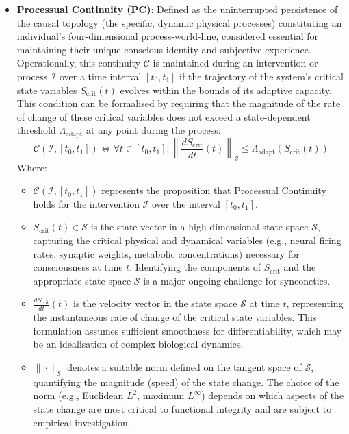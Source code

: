 \documentclass[10pt]{article}
\begin{document}
\begin{sloppypar}
\begin{itemize}
    \item \textbf{Processual Continuity (PC)}: Defined as the uninterrupted persistence of the causal topology (the specific, dynamic physical processes) constituting an individual’s four-dimensional process-world-line, considered essential for maintaining their unique conscious identity and subjective experience. Operationally, this continuity \( \mathcal{C} \) is maintained during an intervention or process \( \mathcal{I} \) over a time interval \( [t_0, t_1] \) if the trajectory of the system’s critical state variables \( S_{\text{crit}}(t) \) evolves within the bounds of its adaptive capacity. This condition can be formalised by requiring that the magnitude of the rate of change of these critical variables does not exceed a state-dependent threshold \( \Lambda_{\text{adapt}} \) at any point during the process:
          \begin{equation}
            \mathcal{C}(\mathcal{I}, [t_0, t_1]) \iff \forall t \in [t_0, t_1] : \left\| \frac{dS_{\text{crit}}}{dt}(t) \right\|_{\mathcal{S}} \le \Lambda_{\text{adapt}}(S_{\text{crit}}(t))
            \label{eq:continuity}
          \end{equation}
          Where:
          \begin{itemize}
            \item \( \mathcal{C}(\mathcal{I}, [t_0, t_1]) \) represents the proposition that Processual Continuity holds for the intervention \( \mathcal{I} \) over the interval \( [t_0, t_1] \).
            \item \( S_{\text{crit}}(t) \in \mathcal{S} \) is the state vector in a high-dimensional state space \( \mathcal{S} \), capturing the critical physical and dynamical variables (e.g., neural firing rates, synaptic weights, metabolic concentrations) necessary for consciousness at time \( t \). Identifying the components of \( S_{\text{crit}} \) and the appropriate state space \( \mathcal{S} \) is a major ongoing challenge for synconetics.
            \item \( \frac{dS_{\text{crit}}}{dt}(t) \) is the velocity vector in the state space \( \mathcal{S} \) at time \( t \), representing the instantaneous rate of change of the critical state variables. This formulation assumes sufficient smoothness for differentiability, which may be an idealisation of complex biological dynamics.
            \item \( \| \cdot \|_{\mathcal{S}} \) denotes a suitable norm defined on the tangent space of \( \mathcal{S} \), quantifying the magnitude (speed) of the state change. The choice of the norm (e.g., Euclidean \( L^2 \), maximum \( L^\infty \)) depends on which aspects of the state change are most critical to functional integrity and are subject to empirical investigation.

\end{itemize}
\end{itemize}
\end{sloppypar}
\end{document}
